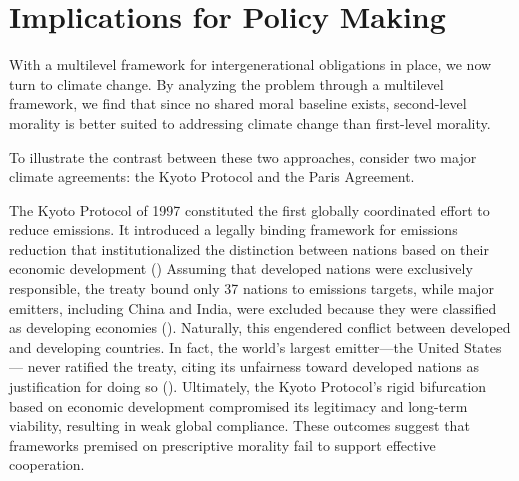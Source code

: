 \section{Implications for Policy Making}

With a multilevel framework for intergenerational obligations in place, we now turn to climate change. By analyzing the problem through a multilevel framework, we find that since no shared moral baseline exists, second-level morality is better suited to addressing climate change than first-level morality.

To illustrate the contrast between these two approaches, consider two major climate agreements: the Kyoto Protocol and the Paris Agreement.

The Kyoto Protocol of 1997 constituted the first globally coordinated effort to reduce emissions. It introduced a legally binding framework for emissions reduction that institutionalized the distinction between nations based on their economic development (\cite[p.\ 24]{maslin-nodate}) Assuming that developed nations were exclusively responsible, the treaty bound only 37 nations to emissions targets, while major emitters, including China and India, were excluded because they were classified as developing economies (\cite{unfccc2025kyoto}). Naturally, this engendered conflict between developed and developing countries. In fact, the world’s largest emitter—the United States— never ratified the treaty, citing its unfairness toward developed nations as justification for doing so (\cite{mignone2007}). Ultimately, the Kyoto Protocol’s rigid bifurcation based on economic development compromised its legitimacy and long-term viability, resulting in weak global compliance. These outcomes suggest that frameworks premised on prescriptive morality fail to support effective cooperation.

